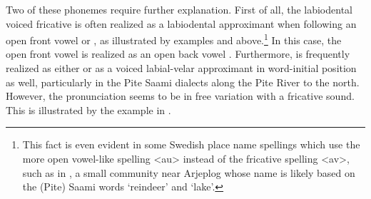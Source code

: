 Two of these phonemes require further explanation. First of all, the labiodental voiced fricative  is often realized as a labiodental approximant \ipa{[ʋ]} when following an open front vowel  or , as illustrated by examples  and  above.\footnote{This fact is even evident in some Swedish place name spellings which use the more open vowel-like spelling <au> instead of the fricative spelling <av>, such as in , a small community near Arjeplog whose name is likely based on the (Pite) Saami words  ‘reindeer’ and  ‘lake’.} %
In this case, the open front vowel is realized as an open back vowel \ipa{[ɑ]}. 
Furthermore,  is frequently realized as either \ipa{[ʋ]} or as a voiced labial-velar approximant \ipa{[w]} in word-initial position as well, particularly in the Pite Saami dialects along the Pite River to the north. However, the \ipa{[ʋ]} pronunciation seems to be in free variation with a fricative \ipa{[v]} sound. 
This is illustrated by the example in .%
\ea\label{cheeseNOMSG}
\z

